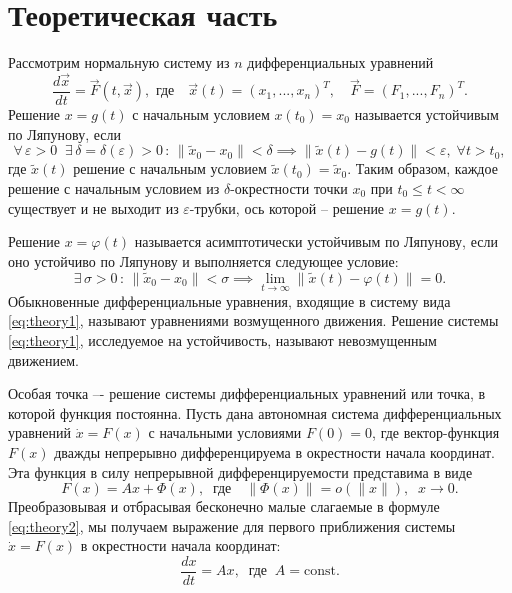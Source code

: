 \documentclass{article}
\begin{document}
\newpage



\section{Теоретическая часть}
Рассмотрим нормальную систему из $n$ дифференциальных уравнений
\begin{equation}
    \dfrac{d\Vec{x}}{dt} = \Vec{F}(t,\Vec{x}),  \text{ где} \quad \vec{x}(t)=(x_1,...,x_n)^T, \quad \vec{F}=(F_1,...,F_n)^T. \label{eq:theory1}
\end{equation}
Решение $x = g(t)$ с начальным условием $x(t_0) = x_0$ называется устойчивым по Ляпунову, если 
\begin{equation*}
\forall\, \varepsilon >0\;\; \exists\,\delta = \delta(\varepsilon)>0\, :\,
\lVert \tilde{x}_0 - x_0\rVert < \delta \implies \lVert \tilde{x}(t) - g(t) \rVert < \varepsilon,\; \forall t>t_0, 
\end{equation*}
где $\tilde{x}(t)$ решение с начальным условием $\tilde{x}(t_0)=\tilde{x}_0$. Таким образом, каждое решение с начальным условием из $\delta$-окрестности точки $x_0$ при $t_0 \leq t < \infty$ существует и не выходит из $\varepsilon$-трубки, ось которой -- решение $x = g(t)$.\par
Решение $x = \varphi(t)$ называется асимптотически устойчивым по Ляпунову, если оно устойчиво по Ляпунову и выполняется следующее условие:
\begin{equation*}
    \exists\, \sigma >0\,:\, \lVert \tilde{x}_0 - x_0\rVert < \sigma \implies \lim_{t\rightarrow\infty} \lVert \tilde{x}(t) - \varphi(t) \rVert =0.
\end{equation*}
Обыкновенные дифференциальные уравнения, входящие в систему вида \ref{eq:theory1}, называют уравнениями возмущенного движения. Решение системы \ref{eq:theory1}, исследуемое на устойчивость, называют невозмущенным движением.\par
Особая точка –- решение системы дифференциальных уравнений или точка, в которой функция постоянна. Пусть дана автономная система дифференциальных уравнений $\dot{x} = F(x)$ с начальными условиями $F(0) = 0$, где вектор-функция $F(x)$ дважды непрерывно дифференцируема в окрестности начала координат. Эта функция в силу непрерывной дифференцируемости представима в виде
\begin{equation} \label{eq:theory2}
    F(x) = Ax + \Phi(x),\;\;\text{где} \quad \lVert \Phi(x) \rVert = o\left(\lVert x\rVert\right), \;\; x\rightarrow0.
\end{equation}
Преобразовывая и отбрасывая бесконечно малые слагаемые в формуле \ref{eq:theory2}, мы получаем выражение для первого приближения системы $\dot{x} = F(x)$ в окрестности начала координат:
\begin{equation} \label{eq:theory3}
    \dfrac{dx}{dt} = Ax, \;\;\text{где} \;\; A=\textrm{const}.
\end{equation}
\vspace{-0.3cm}
\end{document}
